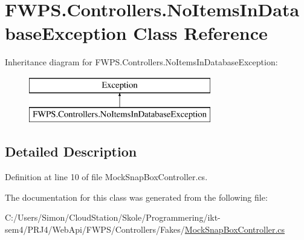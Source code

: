 \hypertarget{class_f_w_p_s_1_1_controllers_1_1_no_items_in_database_exception}{}\section{F\+W\+P\+S.\+Controllers.\+No\+Items\+In\+Database\+Exception Class Reference}
\label{class_f_w_p_s_1_1_controllers_1_1_no_items_in_database_exception}
Inheritance diagram for F\+W\+P\+S.\+Controllers.\+No\+Items\+In\+Database\+Exception\+:\begin{figure}[H]
\begin{center}
\leavevmode
\includegraphics[height=2.000000cm]{class_f_w_p_s_1_1_controllers_1_1_no_items_in_database_exception}
\end{center}
\end{figure}


\subsection{Detailed Description}


Definition at line 10 of file Mock\+Snap\+Box\+Controller.\+cs.



The documentation for this class was generated from the following file\+:\begin{DoxyCompactItemize}
\item 
C\+:/\+Users/\+Simon/\+Cloud\+Station/\+Skole/\+Programmering/ikt-\/sem4/\+P\+R\+J4/\+Web\+Api/\+F\+W\+P\+S/\+Controllers/\+Fakes/\mbox{\hyperlink{_mock_snap_box_controller_8cs}{Mock\+Snap\+Box\+Controller.\+cs}}\end{DoxyCompactItemize}
